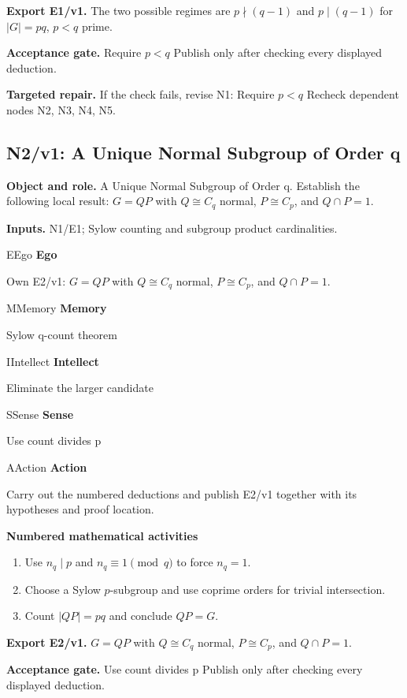 \documentclass[preprint,12pt,aps,pra,showkeys,amsmath,amssymb,superscriptaddress,floatfix]{revtex4-2}
\theoremstyle{definition}
\theoremstyle{remark}
\newcommand{\mmfaculty}[3]{%
 \begin{mmfacultybox}{#1}{#2}
 {\sffamily\bfseries\color{MMBlue}#2}\par\smallskip #3
 \end{mmfacultybox}}
\newcommand{\field}[2]{\par\smallskip\noindent\textbf{#1.} #2\par}
\begin{document}
\field{Export E1/v1}{The two possible regimes are \(p\nmid(q-1)\) and \(p\mid(q-1)\) for
\(|G|=pq\), \(p<q\) prime.}

\field{Acceptance gate}{Require \(p<q\) Publish only after checking every displayed deduction.}

\field{Targeted repair}{If the check fails, revise N1: Require \(p<q\) Recheck dependent nodes
N2, N3, N4, N5.}

\clearpage

\subsection{N2/v1: A Unique Normal Subgroup of Order q}

\field{Object and role}{A Unique Normal Subgroup of Order q. Establish the following local
result: \(G=QP\) with \(Q\cong C_q\) normal, \(P\cong C_p\), and
\(Q\cap P=1\).}

\field{Inputs}{N1/E1; Sylow counting and subgroup product cardinalities.}

\mmfaculty{E}{Ego}{Own E2/v1: \(G=QP\) with \(Q\cong C_q\) normal, \(P\cong C_p\), and
\(Q\cap P=1\).}

\mmfaculty{M}{Memory}{Sylow q-count theorem}

\mmfaculty{I}{Intellect}{Eliminate the larger candidate}

\mmfaculty{S}{Sense}{Use count divides p}

\mmfaculty{A}{Action}{Carry out the numbered deductions and publish E2/v1 together with its
hypotheses and proof location.}

\smallskip\noindent\textbf{Numbered mathematical activities}

\begin{enumerate}[label=N2.\arabic*,leftmargin=3.4em]

\item Use \(n_q\mid p\) and \(n_q\equiv1\pmod q\) to force \(n_q=1\).

\item Choose a Sylow \(p\)-subgroup and use coprime orders for trivial
intersection.

\item Count \(|QP|=pq\) and conclude \(QP=G\).

\end{enumerate}

\field{Export E2/v1}{\(G=QP\) with \(Q\cong C_q\) normal, \(P\cong C_p\), and \(Q\cap P=1\).}

\field{Acceptance gate}{Use count divides p Publish only after checking every displayed
deduction.}
\end{document}
